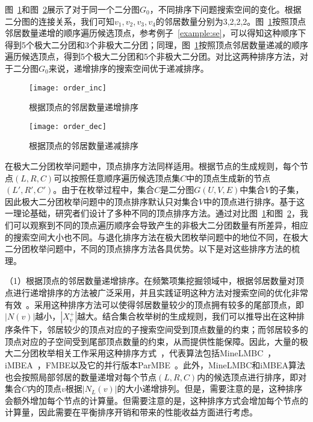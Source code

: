 \begin{example}
  图~\ref{fig:order_inc}和图~\ref{fig:order_dec}展示了对于同一个二分图$G_0$，不同排序下问题搜索空间的变化。根据二分图的连接关系，我们可知$v_1,v_2,v_3,v_4$的邻居数量分别为3,2,2,2。图~\ref{fig:order_inc}按照顶点邻居数量递增的顺序遍历候选顶点，参考例子~\ref{example:se}，可以得知这种顺序下得到5个极大二分团和3个非极大二分团；同理，图~\ref{fig:order_inc}按照顶点邻居数量递减的顺序遍历候选顶点，得到5个极大二分团和5个非极大二分团。对比这两种排序方法，对于二分图$G_0$来说，递增排序的搜索空间优于递减排序。
\end{example}


\begin{figure} 
  \center
    \vspace{0.1in}
		\texttt{[image: order\_inc]}
    \vspace{0.1in}
	\caption{根据顶点的邻居数量递增排序}
	\label{fig:order_inc}
\end{figure}


\begin{figure}
  \center
  \vspace{0.1in}
    \texttt{[image: order\_dec]}
    \vspace{0.1in}
  \caption{根据顶点的邻居数量递减排序}
	\label{fig:order_dec}
\end{figure}

在极大二分团枚举问题中，顶点排序方法同样适用。根据节点的生成规则，每个节点$(L,R,C)$可以按照任意顺序遍历候选顶点集$C$中的顶点生成新的节点$(L',R',C')$。由于在枚举过程中，集合$C$是二分图$G(U,V,E)$中集合$V$的子集，因此极大二分团枚举问题中的顶点排序默认只对集合$V$中的顶点进行排序。基于这一理论基础，研究者们设计了多种不同的顶点排序方法。通过对比图~\ref{fig:order_inc}和图~\ref{fig:order_dec}，我们可以观察到不同的顶点遍历顺序会导致产生的非极大二分团数量有所差异，相应的搜索空间大小也不同。与退化排序方法在极大团枚举问题中的地位不同，在极大二分团枚举问题中，不同的顶点排序方法各具优势。以下是对这些排序方法的梳理。

（1）根据顶点的邻居数量递增排序。在频繁项集挖掘领域中，根据邻居数量对顶点进行递增排序的方法被广泛采用，并且实践证明这种方法对搜索空间的优化非常有效~\cite{lcm04}。采用这种排序方法可以使得邻居数量较少的顶点拥有较多的尾部顶点，即$|N(v)|$越小，$|X_v^+|$越大。结合集合枚举树的生成规则，我们可以推导出在这种排序条件下，邻居较少的顶点对应的子搜索空间受到顶点数量的约束；而邻居较多的顶点对应的子空间受到尾部顶点数量的约束，从而提供性能保障。因此，大量的极大二分团枚举相关工作采用这种排序方式~\cite{lcmmbc07,minel06,iMBEA14,mapreduceMBE16,parMBE18,MEB20}，代表算法包括MineLMBC~\cite{minel06}，iMBEA~\cite{iMBEA14}，FMBE以及它的并行版本ParMBE~\cite{parMBE18}。此外，MineLMBC和iMBEA算法也会按照局部邻居的数量递增对每个节点$(L,R,C)$内的候选顶点进行排序，即对集合$C$内的顶点$v$根据$|N_L(v)|$的大小递增排列。但是，需要注意的是，这种排序会额外增加每个节点的计算量。但需要注意的是，这种排序方式会增加每个节点的计算量，因此需要在平衡排序开销和带来的性能收益方面进行考虑。

